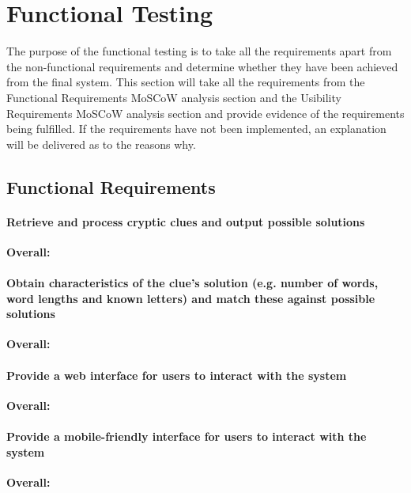 \section{Functional Testing}
\label{sec:functional_testing}

The purpose of the functional testing is to take all the requirements apart from 
the non-functional requirements and determine whether they have been achieved 
from the final system. This section will take all the requirements from the Functional 
Requirements MoSCoW analysis section and the Usibility Requirements MoSCoW analysis 
section and provide evidence of the requirements being fulfilled. If the requirements have 
not been implemented, an explanation will be delivered as to the reasons why. 

\subsection{Functional Requirements}
\label{sub:test_func_func}

\paragraph{Retrieve and process cryptic clues and output possible
solutions}

{\bf Overall:} 

\paragraph{Obtain characteristics of the clue's solution (e.g. number of words, 
word lengths and known letters) and
match these against possible solutions}

{\bf Overall:}

\paragraph{Provide a web interface for users to interact with the
system}

{\bf Overall:}

\paragraph{Provide a mobile-friendly interface for users to interact
with the system}

{\bf Overall:}

